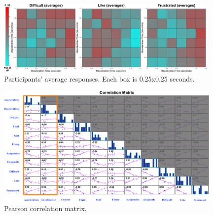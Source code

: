 \begin{figure}[!htb]
\centering
\includegraphics[width=0.97\textwidth]{Pics/Classes/averages/difficult_like_frustration_avg}
\caption{Participants' average responses. Each box is 0.25x0.25 seconds.}
\label{fig:difficult_like_frustration_avg}
\end{figure}

\begin{figure}[htbp]
\centering
\includegraphics[width=0.98\textwidth]{Pics/correlationMatrix_final}
\caption{Pearson correlation matrix.}
\label{fig:correlationMatrix}
\end{figure}

